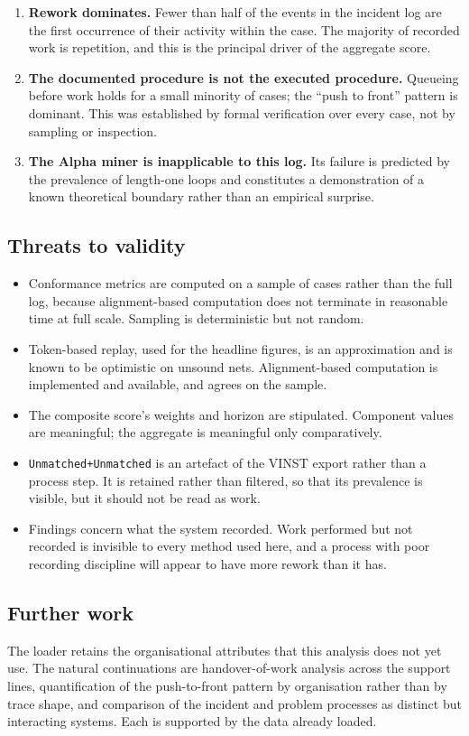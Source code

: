 \documentclass[12pt,a4paper]{article}
\newcommand{\act}[1]{\texttt{#1}}
\begin{document}
\begin{enumerate}
  \item \textbf{Rework dominates.} Fewer than half of the events in the incident
        log are the first occurrence of their activity within the case. The
        majority of recorded work is repetition, and this is the principal
        driver of the aggregate score.
  \item \textbf{The documented procedure is not the executed procedure.}
        Queueing before work holds for a small minority of cases; the ``push to
        front'' pattern is dominant. This was established by formal verification
        over every case, not by sampling or inspection.
  \item \textbf{The Alpha miner is inapplicable to this log.} Its failure is
        predicted by the prevalence of length-one loops and constitutes a
        demonstration of a known theoretical boundary rather than an empirical
        surprise.
\end{enumerate}

\subsection{Threats to validity}\label{sec:threats}

\begin{itemize}
  \item Conformance metrics are computed on a sample of cases rather than the
        full log, because alignment-based computation does not terminate in
        reasonable time at full scale. Sampling is deterministic but not random.
  \item Token-based replay, used for the headline figures, is an approximation
        and is known to be optimistic on unsound nets. Alignment-based
        computation is implemented and available, and agrees on the sample.
  \item The composite score's weights and horizon are stipulated. Component
        values are meaningful; the aggregate is meaningful only comparatively.
  \item \act{Unmatched+Unmatched} is an artefact of the VINST export rather than
        a process step. It is retained rather than filtered, so that its
        prevalence is visible, but it should not be read as work.
  \item Findings concern what the system recorded. Work performed but not
        recorded is invisible to every method used here, and a process with poor
        recording discipline will appear to have more rework than it has.
\end{itemize}

\subsection{Further work}

The loader retains the organisational attributes that this analysis does not yet
use. The natural continuations are handover-of-work analysis across the support
lines, quantification of the push-to-front pattern by organisation rather than
by trace shape, and comparison of the incident and problem processes as distinct
but interacting systems. Each is supported by the data already loaded.
\end{document}
